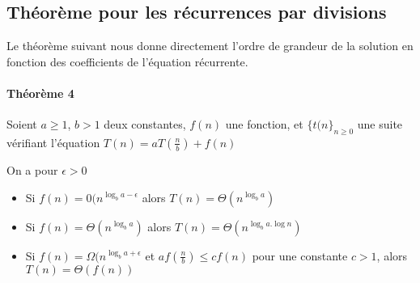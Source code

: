 	\subsection{Théorème pour les récurrences par divisions}
	Le théorème suivant nous donne directement l'ordre de grandeur de la solution en fonction des coefficients de l'équation récurrente.

	\paragraph{Théorème 4} Soient $a \geq 1$, $b > 1$ deux constantes, $f(n)$ une fonction, et $\{t(n\}_{n\geq 0}$ une suite vérifiant l'équation 
	$T(n) = aT(\frac{n}{b}) + f(n)$

	On a pour $\epsilon > 0$
\begin{itemize}
	\item Si $f(n) = 0(n^{\log_b a - \epsilon}$ alors $T(n) = \Theta(n^{\log_b a})$
	\item Si $f(n) = \Theta(n^{\log_b a})$ alors $T(n) = \Theta(n^{\log_b a . \log n})$
	\item Si $f(n) = \Omega(n^{\log_b a + \epsilon}$ et $af(\frac{n}{b}) \leq cf(n)$ pour une constante $c >1$, alors $T(n) = \Theta(f(n))$
\end{itemize}
